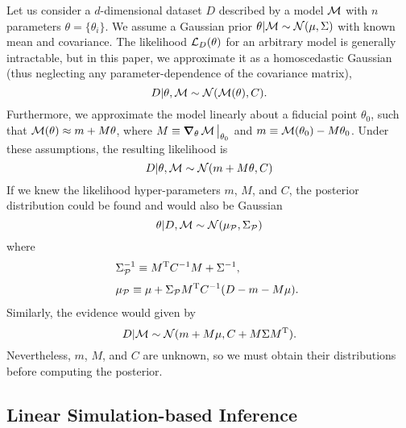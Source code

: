 \documentclass[%
 reprint,
 amsmath,amssymb,
 aps,
]{revtex4-2}
\begin{document}
Let us consider a $d$-dimensional dataset $D$ described by a model $\mathcal{M}$ with $n$ parameters $\theta = \{\theta_i\}$. We assume a Gaussian prior $\theta|\mathcal{M} \sim \mathcal{N}(\mu,\Sigma )$ with known mean and covariance.  The likelihood $\mathcal{L}_D(\theta)$ for an arbitrary model is generally intractable, but in this paper, we approximate it as a homoscedastic Gaussian (thus neglecting any parameter-dependence of the covariance matrix),
\begin{equation}\label{eq:likelihood1}
	D|\theta,\mathcal{M} \sim \mathcal{N}(\mathcal{M}(\theta),C ).
\end{equation} 
Furthermore, we approximate the model linearly about a fiducial point $\theta_0$, such that $\mathcal{M}(\theta) \approx m + M\theta$, where $M \equiv \grad_{\theta}\,\mathcal{M}\,\big\vert_{\theta_0}$ and $m \equiv \mathcal{M}(\theta_0) - M\theta_0$. Under these assumptions, the resulting likelihood is
\begin{equation} \label{eq:likelihood}
	D|\theta,\mathcal{M} \sim \mathcal{N}(m + M\theta,C )
\end{equation}
If we knew the likelihood hyper-parameters $m$, $M$, and $C$, the posterior distribution could be found and would also be Gaussian
\begin{equation}\label{eq:posterior}
	\theta| D,\mathcal{M}\sim \mathcal{N}(\mu_\mathcal{P},\Sigma_\mathcal{P})
\end{equation}
where 
\begin{align}
	\label{posterior_cov} &	\Sigma_\mathcal{P}^{-1} \equiv M^{\mathrm{T}} C^{-1} M + \Sigma^{-1} ,				\\[1mm]
	\label{posterior_mean}&	\mu_\mathcal{P} \equiv \mu +  \Sigma_\mathcal{P}	 M^{\mathrm{T}} C^{-1} (D-m-M\mu) .\
\end{align}
Similarly, the evidence would given by
\begin{equation} \label{eq:evidence}
	D|\mathcal{M} \sim \mathcal{N}(m+M\mu, C+M\Sigma M^{\mathrm{T}}).
\end{equation}
Nevertheless, $m$, $M$, and $C$ are unknown, so we must obtain their distributions before computing the posterior.\\


\subsection{Linear Simulation-based Inference} \label{sec:LSBI}
\end{document}
